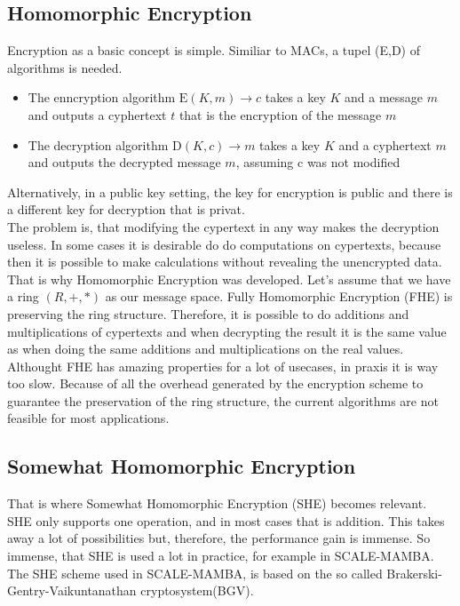 \documentclass[english,runningheads,a4paper]{llncs}[2018/03/10]
\begin{document}
\subsection{Homomorphic Encryption}
Encryption as a basic concept is simple. Similiar to MACs, a tupel (E,D) of algorithms is needed.\\
\begin{itemize}
\item The enncryption algorithm \(\text{E}(K,m)\rightarrow c\) takes a key \(K\) and a message \(m\) and outputs a cyphertext \(t\) that is the encryption of the message \(m\)\\
\item The decryption algorithm \(\text{D}(K,c)\rightarrow m\) takes a key \(K\) and a cyphertext \(m\) and outputs the decrypted message \(m\), assuming c was not modified\\
\end{itemize}
Alternatively, in a public key setting, the key for encryption is public and there is a different key for decryption that is privat.\\
The problem is, that modifying the cypertext in any way makes the decryption useless. In some cases it is desirable do do computations on cypertexts, because then it is possible to make calculations without revealing the unencrypted data. That is why Homomorphic Encryption was developed. Let's assume that we have a ring \((R,+,*)\) as our message space. Fully Homomorphic Encryption (FHE) is preserving the ring structure. Therefore, it is possible to do additions and multiplications of cypertexts and when decrypting the result it is the same value as when doing the same additions and multiplications on the real values.\\
Althought FHE has amazing properties for a lot of usecases, in praxis it is way too slow. Because of all the overhead generated by the encryption scheme to guarantee the preservation of the ring structure, the current algorithms are not feasible for most applications.

\subsection{Somewhat Homomorphic Encryption}
That is where Somewhat Homomorphic Encryption (SHE) becomes relevant. SHE only supports one operation, and in most cases that is addition. This takes away a lot of possibilities but, therefore, the performance gain is immense. So immense, that SHE is used a lot in practice, for example in SCALE-MAMBA.\\
The SHE scheme used in SCALE-MAMBA, is based on the so called Brakerski-Gentry-Vaikuntanathan cryptosystem(BGV).\\
\end{document}
